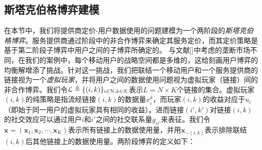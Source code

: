 \subsection{斯塔克伯格博弈建模}
在本节中，我们将提供商定价-用户数据使用的问题建模为一个两阶段的\emph{斯塔克伯格博弈}。服务提供商通过阶段\uppercase\expandafter{}中的非合作博弈来确定其服务定价，而其定价策略是基于第二阶段子博弈中用户之间的子博弈所确定的。
与文献[]中考虑的垄断市场不同，在我们的案例中，每个移动用户的战略空间都是多维的，这给刻画用户博弈的均衡解增添了挑战。针对这一挑战，我们把联结一个移动用户和一个服务提供商的链接视为一个\emph{虚拟玩家}，并将用户之间的数据使用问题视为虚拟玩家（链接）间的非合作博弈。我们令$\mathcal{L}\triangleq\{(i,k)\}_{i\in\mathcal{N},k\in\mathcal{K}}$表示$L = N\times K$个链接的集合。虚拟玩家$(i,k)$的纯策略是指流经链接$(i,k)$的数据量$x^{k}_{i}$，而玩家$(i,k)$的收益对应于$u_{i}$（即始于同一用户的虚拟玩家具有相同的收益）。进而链接$(i',k')$对链接$(i,k)$的社交效应可以通过用户$i$和$i'$之间的社交联系量$g_{ii'}$来表征。我们令$\mathbf{x}=(\mathbf{x}_{1},\mathbf{x}_{2},\cdots,\mathbf{x}_{K})$表示所有链接上的数据使用量，并用$\mathbf{x}_{-(i,k)}$表示排除联结$(i,k)$后其他链接上的数据使用量。两阶段博弈的定义如下：

